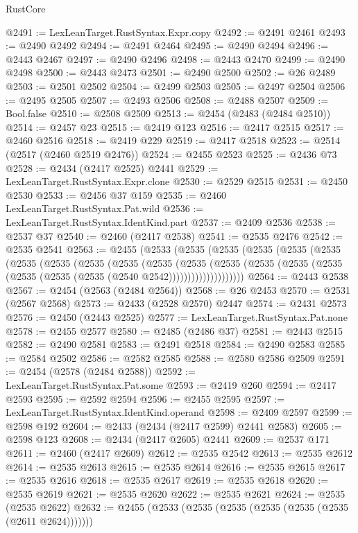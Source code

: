 \begin{lexlean}{RustCore}
\begin{coremodule}
@2491 := LexLeanTarget.RustSyntax.Expr.copy
@2492 := @2491 @2461
@2493 := @2490 @2492
@2494 := @2491 @2464
@2495 := @2490 @2494
@2496 := @2443 @2467
@2497 := @2490 @2496
@2498 := @2443 @2470
@2499 := @2490 @2498
@2500 := @2443 @2473
@2501 := @2490 @2500
@2502 := @26 @2489
@2503 := @2501 @2502
@2504 := @2499 @2503
@2505 := @2497 @2504
@2506 := @2495 @2505
@2507 := @2493 @2506
@2508 := @2488 @2507
@2509 := Bool.false
@2510 := @2508 @2509
@2513 := @2454 (@2483 (@2484 @2510))
@2514 := @2457 @23
@2515 := @2419 @123
@2516 := @2417 @2515
@2517 := @2460 @2516
@2518 := @2419 @229
@2519 := @2417 @2518
@2523 := @2514 (@2517 (@2460 @2519 @2476))
@2524 := @2455 @2523
@2525 := @2436 @73
@2528 := @2434 (@2417 @2525) @2441
@2529 := LexLeanTarget.RustSyntax.Expr.clone
@2530 := @2529 @2515
@2531 := @2450 @2530
@2533 := @2456 @37 @159
@2535 := @2460 LexLeanTarget.RustSyntax.Pat.wild
@2536 := LexLeanTarget.RustSyntax.IdentKind.part
@2537 := @2409 @2536
@2538 := @2537 @37
@2540 := @2460 (@2417 @2538)
@2541 := @2535 @2476
@2542 := @2535 @2541
@2563 := @2455
    (@2533
      (@2535
        (@2535
          (@2535
            (@2535
              (@2535
                (@2535
                  (@2535
                    (@2535
                      (@2535
                        (@2535
                          (@2535
                            (@2535
                              (@2535
                                (@2535 (@2535 (@2535 (@2535 (@2535 (@2540 @2542))))))))))))))))))))
@2564 := @2443 @2538
@2567 := @2454 (@2563 (@2484 @2564))
@2568 := @26 @2453
@2570 := @2531 (@2567 @2568)
@2573 := @2433 (@2528 @2570) @2447
@2574 := @2431 @2573
@2576 := @2450 (@2443 @2525)
@2577 := LexLeanTarget.RustSyntax.Pat.none
@2578 := @2455 @2577
@2580 := @2485 (@2486 @37)
@2581 := @2443 @2515
@2582 := @2490 @2581
@2583 := @2491 @2518
@2584 := @2490 @2583
@2585 := @2584 @2502
@2586 := @2582 @2585
@2588 := @2580 @2586 @2509
@2591 := @2454 (@2578 (@2484 @2588))
@2592 := LexLeanTarget.RustSyntax.Pat.some
@2593 := @2419 @260
@2594 := @2417 @2593
@2595 := @2592 @2594
@2596 := @2455 @2595
@2597 := LexLeanTarget.RustSyntax.IdentKind.operand
@2598 := @2409 @2597
@2599 := @2598 @192
@2604 := @2433 (@2434 (@2417 @2599) @2441 @2583)
@2605 := @2598 @123
@2608 := @2434 (@2417 @2605) @2441
@2609 := @2537 @171
@2611 := @2460 (@2417 @2609)
@2612 := @2535 @2542
@2613 := @2535 @2612
@2614 := @2535 @2613
@2615 := @2535 @2614
@2616 := @2535 @2615
@2617 := @2535 @2616
@2618 := @2535 @2617
@2619 := @2535 @2618
@2620 := @2535 @2619
@2621 := @2535 @2620
@2622 := @2535 @2621
@2624 := @2535 (@2535 @2622)
@2632 := @2455 (@2533 (@2535 (@2535 (@2535 (@2535 (@2535 (@2611 @2624)))))))

\end{coremodule}
\end{lexlean}
